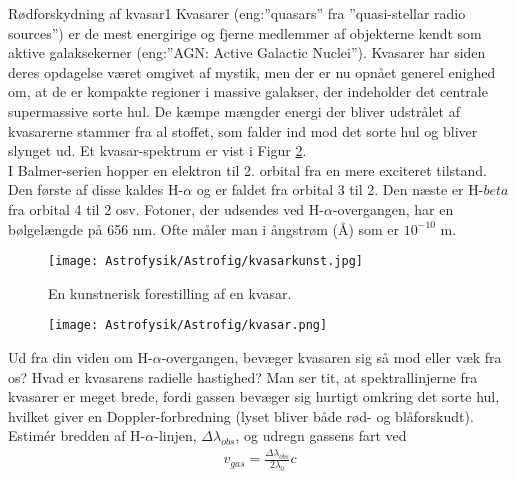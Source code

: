 \begin{opgave}{Rødforskydning af kvasar}{1}
	Kvasarer (eng:”quasars” fra ”quasi-stellar radio sources”) er de mest energirige og
	fjerne medlemmer af objekterne kendt som aktive galaksekerner (eng:”AGN: Active
	Galactic Nuclei”). Kvasarer har siden deres opdagelse været omgivet af mystik, men
	der er nu opnået generel enighed om, at de er kompakte regioner i massive galakser,
	der indeholder det centrale supermassive sorte hul. De kæmpe mængder energi der
	bliver udstrålet af kvasarerne stammer fra al stoffet, som falder ind mod det sorte
	hul og bliver slynget ud.
	Et kvasar-spektrum er vist i Figur \ref{kvasar}.
	\\
	I Balmer-serien hopper en elektron til 2. orbital fra en mere exciteret tilstand. Den første af disse kaldes H-$\alpha$ og er faldet fra orbital 3 til 2. Den næste er H-$beta$ fra orbital 4 til 2 osv. Fotoner, der udsendes ved H-$\alpha$-overgangen, har en bølgelængde på 656 nm. Ofte måler man i ångstrøm (Å) som er $10^{-10}$ m.\\
		\begin{figure}[h!]
			\centering
			\texttt{[image: Astrofysik/Astrofig/kvasarkunst.jpg]}
			\caption{En kunstnerisk forestilling af en kvasar.} %
			\label{kvasarkunst}
		\end{figure}
	\begin{figure}[h!]
		\centering
		\texttt{[image: Astrofysik/Astrofig/kvasar.png]}
		\label{kvasar}
	\end{figure}
	\opg Ud fra din viden om H-$\alpha$-overgangen, bevæger kvasaren sig så mod eller væk fra os?
	\opg Hvad er kvasarens radielle hastighed?
	\opg Man ser tit, at spektrallinjerne fra kvasarer er meget brede, fordi gassen bevæger sig hurtigt omkring det sorte hul, hvilket giver en Doppler-forbredning
	(lyset bliver både rød- og blåforskudt). Estimér bredden af H-$\alpha$-linjen, $\Delta\lambda_{obs}$, og udregn gassens fart ved 
	\begin{align}
		v_{gas}=\frac{\Delta \lambda_{obs}}{2\lambda_{0}}c
	\end{align}
\end{opgave}


